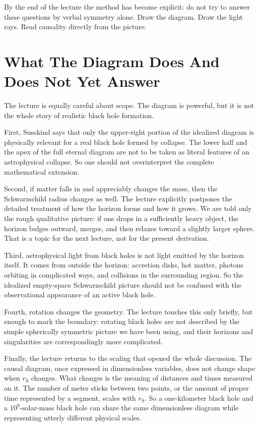 By the end of the lecture the method has become explicit: do not try to answer these questions by verbal symmetry alone. Draw the diagram. Draw the light rays. Read causality directly from the picture.

\section{What The Diagram Does And Does Not Yet Answer}

The lecture is equally careful about scope. The diagram is powerful, but it is not the whole story of realistic black hole formation.

First, Susskind says that only the upper-right portion of the idealized diagram is physically relevant for a real black hole formed by collapse. The lower half and the apex of the full eternal diagram are not to be taken as literal features of an astrophysical collapse. So one should not overinterpret the complete mathematical extension.

Second, if matter falls in and appreciably changes the mass, then the Schwarzschild radius changes as well. The lecture explicitly postpones the detailed treatment of how the horizon forms and how it grows. We are told only the rough qualitative picture: if one drops in a sufficiently heavy object, the horizon bulges outward, merges, and then relaxes toward a slightly larger sphere. That is a topic for the next lecture, not for the present derivation.

Third, astrophysical light from black holes is not light emitted by the horizon itself. It comes from outside the horizon: accretion disks, hot matter, photons orbiting in complicated ways, and collisions in the surrounding region. So the idealized empty-space Schwarzschild picture should not be confused with the observational appearance of an active black hole.

Fourth, rotation changes the geometry. The lecture touches this only briefly, but enough to mark the boundary: rotating black holes are not described by the simple spherically symmetric picture we have been using, and their horizons and singularities are correspondingly more complicated.

Finally, the lecture returns to the scaling that opened the whole discussion. The causal diagram, once expressed in dimensionless variables, does not change shape when \(r_{\mathrm S}\) changes. What changes is the meaning of distances and times measured on it. The number of meter sticks between two points, or the amount of proper time represented by a segment, scales with \(r_{\mathrm S}\). So a one-kilometer black hole and a \(10^9\)-solar-mass black hole can share the same dimensionless diagram while representing utterly different physical scales.

